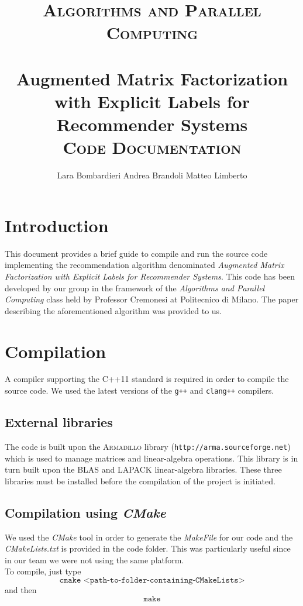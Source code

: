 \documentclass[paper=a4, fontsize=12pt]{scrartcl} %
\title{	
\normalfont \normalsize 
\textsc{Algorithms and Parallel Computing} \\ [25pt] %
\horrule{0.5pt} \\[0.4cm] %
\huge Augmented Matrix Factorization with Explicit Labels for Recommender Systems \\[0.7 cm] %
\normalsize \textsc{Code Documentation}
\horrule{0.5pt} \\[0.1cm] %
}
\author{\normalsize Lara Bombardieri \hspace{1 cm} Andrea Brandoli \hspace{1 cm} Matteo Limberto} %
\date{} %
\numberwithin{equation}{section} %
\numberwithin{figure}{section} %
\numberwithin{table}{section} %
\begin{document}
\maketitle %

\section{Introduction}

This document provides a brief guide to compile and run the source code implementing the recommendation algorithm denominated \emph{Augmented Matrix Factorization with Explicit Labels for Recommender Systems}. This code has been developed by our group in the framework of the \emph{Algorithms and Parallel Computing} class held by Professor Cremonesi at Politecnico di Milano. The paper describing the aforementioned algorithm was provided to us.

\section{Compilation}

A compiler supporting the \textsc{C++11} standard is required in order to compile the source code. We used the latest versions of the \texttt{g++} and \texttt{clang++} compilers.

\subsection{External libraries}

The code is built upon the \textsc{Armadillo} library (\texttt{http://arma.sourceforge.net}) which is used to manage matrices and linear-algebra operations. This library is in turn built upon the \textsc{BLAS} and \textsc{LAPACK} linear-algebra libraries. These three libraries must be installed before the compilation of the project is initiated.

\subsection{Compilation using \emph{CMake} }

We used the \emph{CMake} tool in order to generate the \emph{MakeFile} for our code and the  \emph{CMakeLists.txt} is provided in the code folder. This was particularly useful since in our team we were not using the same platform. \\ 

To compile, just type 
\begin{equation*}
\texttt{cmake <path-to-folder-containing-CMakeLists>}
\end{equation*}
and then 
\begin{equation*}
\texttt{make}
\end{equation*}
\end{document}
